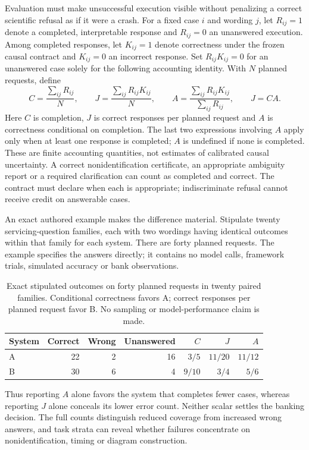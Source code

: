 Evaluation must make unsuccessful execution visible without penalizing a
correct scientific refusal as if it were a crash. For a fixed case $i$ and
wording $j$, let $R_{ij}=1$ denote a completed, interpretable response and
$R_{ij}=0$ an unanswered execution. Among completed responses, let
$K_{ij}=1$ denote correctness under the frozen causal contract and
$K_{ij}=0$ an incorrect response. Set $R_{ij}K_{ij}=0$ for an unanswered
case solely for the following accounting identity. With $N$ planned
requests, define
\begin{equation}
 C=\frac{\sum_{ij}R_{ij}}{N},\qquad
 J=\frac{\sum_{ij}R_{ij}K_{ij}}{N},\qquad
 A=\frac{\sum_{ij}R_{ij}K_{ij}}{\sum_{ij}R_{ij}},
 \qquad J=CA .
 \label{exec18:framework-denominators}
\end{equation}
Here $C$ is completion, $J$ is correct responses per planned request and
$A$ is correctness conditional on completion. The last two expressions
involving $A$ apply only when at least one response is completed; $A$ is
undefined if none is completed. These are finite accounting quantities,
not estimates of calibrated causal uncertainty. A correct
nonidentification certificate, an appropriate ambiguity report or a
required clarification can count as completed and correct. The contract
must declare when each is appropriate; indiscriminate refusal cannot
receive credit on answerable cases. \citep{exec18_framework_reference}

An exact authored example makes the difference material. Stipulate twenty
servicing-question families, each with two wordings having identical
outcomes within that family for each system. There are forty planned
requests. The example specifies the answers directly; it contains no model
calls, framework trials, simulated accuracy or bank observations.
\begin{table}[htbp]
\centering
\small
\begin{tabular}{@{}lrrrrrr@{}}
\toprule
System & Correct & Wrong & Unanswered & $C$ & $J$ & $A$\\
\midrule
A & 22 & 2 & 16 & $3/5$ & $11/20$ & $11/12$\\
B & 30 & 6 & 4 & $9/10$ & $3/4$ & $5/6$\\
\bottomrule
\end{tabular}
\caption{Exact stipulated outcomes on forty planned requests in twenty
paired families. Conditional correctness favors A; correct responses per
planned request favor B. No sampling or model-performance claim is made.}
\label{exec18:framework-example}
\end{table}
Thus reporting $A$ alone favors the system that completes fewer cases,
whereas reporting $J$ alone conceals its lower error count. Neither scalar
settles the banking decision. The full counts distinguish reduced coverage
from increased wrong answers, and task strata can reveal whether failures
concentrate on nonidentification, timing or diagram construction.
\citep{exec18_framework_reference}

